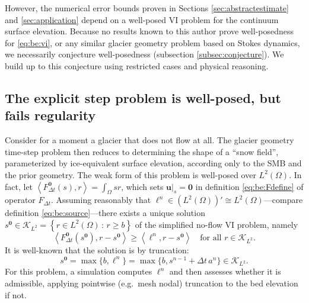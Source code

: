 \documentclass[hidelinks,onefignum,onetabnum,final]{siamart220329}  %
\newcommand{\bu}{\mathbf{u}}
\newcommand{\bzero}{\bm{0}}
\newcommand{\cK}{\mathcal{K}}
\newcommand{\ip}[2]{\left<#1,#2\right>}
\begin{document}
However, the numerical error bounds proven in Sections \ref{sec:abstractestimate} and \ref{sec:application} depend on a well-posed VI problem for the continuum surface elevation.  Because no results known to this author prove well-posedness for \eqref{eq:be:vi}, or any similar glacier geometry problem based on Stokes dynamics, we necessarily conjecture well-posedness (subsection \ref{subsec:conjecture}).  We build up to this conjecture using restricted cases and physical reasoning.

\subsection{The explicit step problem is well-posed, but fails regularity} \label{subsec:explicit}   Consider for a moment a glacier that does not flow at all.  The glacier geometry time-step problem then reduces to determining the shape of a ``snow field'', parameterized by ice-equivalent surface elevation, according only to the SMB and the prior geometry.  The weak form of this problem is well-posed over $L^2(\Omega)$.  In fact, let $\ip{F^{\bzero}_{\Delta t}(s)}{r} = \int_\Omega sr$, which sets $\bu|_s=\bzero$ in definition \eqref{eq:be:Fdefine} of operator $F_{\Delta t}$.  Assuming reasonably that $\ell^n \in (L^2(\Omega))' \cong L^2(\Omega)$---compare definition \eqref{eq:be:source}---there exists a unique solution $s^{\bzero} \in \cK_{L^2} = \left\{r\in L^2(\Omega)\,:\,r \ge b\right\}$ of the simplified no-flow VI problem, namely
\begin{equation}
\ip{F^{\bzero}_{\Delta t}(s^{\bzero})}{r-s^{\bzero}} \ge \ip{\ell^n}{r-s^{\bzero}} \quad \text{for all } r \in \cK_{L^2}.
\end{equation}
It is well-known \cite[section II.3]{KinderlehrerStampacchia1980} that the solution is by truncation:
\begin{equation}
s^{\bzero} = \max\{b, \ell^n\} = \max\{b, s^{n-1} + \Delta t\,a^n\} \in \cK_{L^2}.
\end{equation}
For this problem, a simulation computes $\ell^n$ and then assesses whether it is admissible, applying pointwise (e.g.~mesh nodal) truncation to the bed elevation if not.
\end{document}
